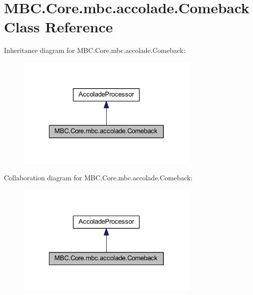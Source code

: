 \hypertarget{class_m_b_c_1_1_core_1_1mbc_1_1accolade_1_1_comeback}{\section{M\-B\-C.\-Core.\-mbc.\-accolade.\-Comeback Class Reference}
\label{class_m_b_c_1_1_core_1_1mbc_1_1accolade_1_1_comeback}
}


Inheritance diagram for M\-B\-C.\-Core.\-mbc.\-accolade.\-Comeback\-:
\nopagebreak
\begin{figure}[H]
\begin{center}
\leavevmode
\includegraphics[width=254pt]{class_m_b_c_1_1_core_1_1mbc_1_1accolade_1_1_comeback__inherit__graph}
\end{center}
\end{figure}


Collaboration diagram for M\-B\-C.\-Core.\-mbc.\-accolade.\-Comeback\-:
\nopagebreak
\begin{figure}[H]
\begin{center}
\leavevmode
\includegraphics[width=254pt]{class_m_b_c_1_1_core_1_1mbc_1_1accolade_1_1_comeback__coll__graph}
\end{center}
\end{figure}
